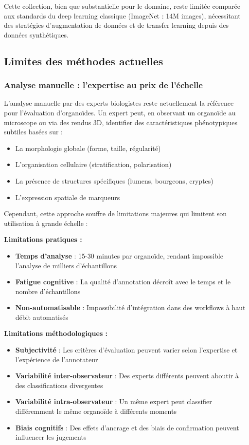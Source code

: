 Cette collection, bien que substantielle pour le domaine, reste limitée comparée aux standards du deep learning classique (ImageNet : 14M images), nécessitant des stratégies d'augmentation de données et de transfer learning depuis des données synthétiques.

\subsection{Limites des méthodes actuelles}

\subsubsection{Analyse manuelle : l'expertise au prix de l'échelle}

L'analyse manuelle par des experts biologistes reste actuellement la référence pour l'évaluation d'organoïdes. Un expert peut, en observant un organoïde au microscope ou via des rendus 3D, identifier des caractéristiques phénotypiques subtiles basées sur :
\begin{itemize}
    \item La morphologie globale (forme, taille, régularité)
    \item L'organisation cellulaire (stratification, polarisation)
    \item La présence de structures spécifiques (lumens, bourgeons, cryptes)
    \item L'expression spatiale de marqueurs
\end{itemize}

Cependant, cette approche souffre de limitations majeures qui limitent son utilisation à grande échelle :

\textbf{Limitations pratiques :}
\begin{itemize}
    \item \textbf{Temps d'analyse} : 15-30 minutes par organoïde, rendant impossible l'analyse de milliers d'échantillons
    \item \textbf{Fatigue cognitive} : La qualité d'annotation décroît avec le temps et le nombre d'échantillons
    \item \textbf{Non-automatisable} : Impossibilité d'intégration dans des workflows à haut débit automatisés
\end{itemize}

\textbf{Limitations méthodologiques :}
\begin{itemize}
    \item \textbf{Subjectivité} : Les critères d'évaluation peuvent varier selon l'expertise et l'expérience de l'annotateur
    \item \textbf{Variabilité inter-observateur} : Des experts différents peuvent aboutir à des classifications divergentes
    \item \textbf{Variabilité intra-observateur} : Un même expert peut classifier différemment le même organoïde à différents moments
    \item \textbf{Biais cognitifs} : Des effets d'ancrage et des biais de confirmation peuvent influencer les jugements
\end{itemize}


